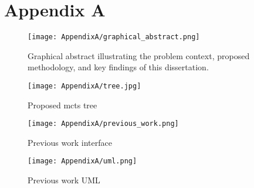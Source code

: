 
\chapter*{Appendix A} %

\label{AppendixA} %

\begin{figure}
      \centering
      \texttt{[image: AppendixA/graphical\_abstract.png]}
      \caption[Proposed \ac{mcts} tree]
      {Graphical abstract illustrating the problem context, proposed methodology, and key findings of this dissertation.}
      \label{fig:graphical_abstract}
\end{figure}

\begin{figure}
      \centering
      \texttt{[image: AppendixA/tree.jpg]}
      \caption[Proposed \ac{mcts} tree]
      {Proposed \ac{mcts} tree}
      \label{fig:tree}
\end{figure}


\begin{figure}
      \centering
      \texttt{[image: AppendixA/previous\_work.png]}
      \caption[Previous work interface]
      {Previous work interface}
      \label{fig:previous_work_interface}
\end{figure}

\begin{figure}
      \centering
      \texttt{[image: AppendixA/uml.png]}
      \caption[Previous work UML]
      {Previous work UML}
      \label{fig:previous_work_uml}
\end{figure}

\vspace*{10cm}
\newfontfamily{}
